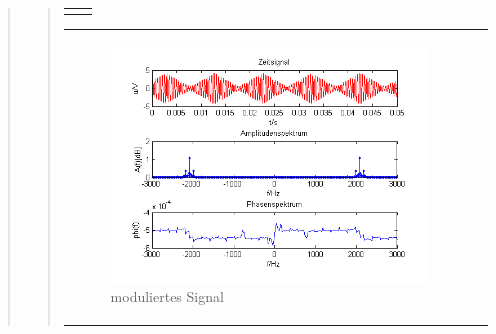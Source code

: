 \begin{quote}
\begin{quote}
\begin{center}
\begin{tabular}{ll}
\begin{minipage}{0.67\textwidth}
            \end{minipage}
        
        \end{tabular}
        \end{center}
        
        \begin{center}
        \begin{tabular}{ll}
        
        \hspace{-5cm}
            \begin{minipage}{0.67\textwidth}
                
                \begin{figure}[H]
                    \includegraphics[scale=0.7]{Bilder/Am_Dre_2k_100Hz_mo}
                    \caption{moduliertes Signal}
                    \label{fig:DemodreieckmT}
                \end{figure}
        
            \end{minipage}
        

\end{tabular}
\end{center}
\end{quote}
\end{quote}
